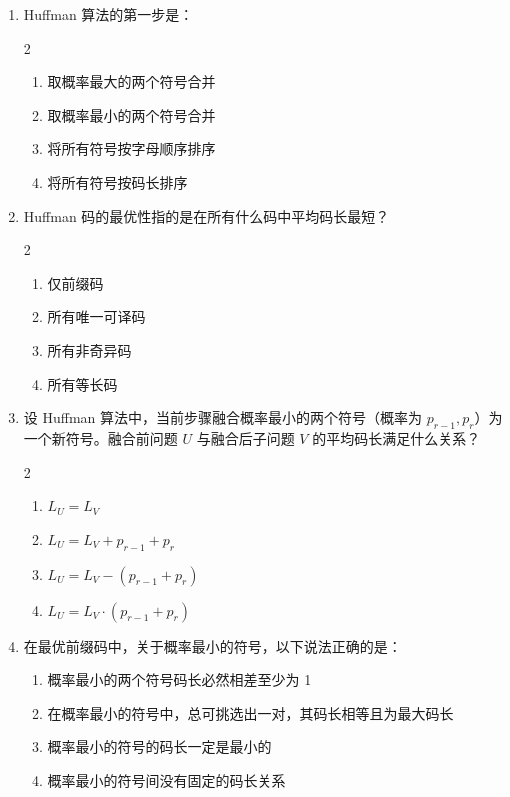 \documentclass[12pt,a4paper]{ctexart}
\begin{document}
\begin{enumerate}[label=\arabic*., leftmargin=*]

\item Huffman 算法的第一步是：
\begin{multicols}{2}
\begin{enumerate}[label=(\Alph*)]
  \item 取概率最大的两个符号合并
  \item 取概率最小的两个符号合并
  \item 将所有符号按字母顺序排序
  \item 将所有符号按码长排序
\end{enumerate}
\end{multicols}

\item Huffman 码的最优性指的是在所有什么码中平均码长最短？
\begin{multicols}{2}
\begin{enumerate}[label=(\Alph*)]
  \item 仅前缀码
  \item 所有唯一可译码
  \item 所有非奇异码
  \item 所有等长码
\end{enumerate}
\end{multicols}

\item 设 Huffman 算法中，当前步骤融合概率最小的两个符号（概率为 $p_{r-1}, p_r$）为一个新符号。融合前问题 $U$ 与融合后子问题 $V$ 的平均码长满足什么关系？
\begin{multicols}{2}
\begin{enumerate}[label=(\Alph*)]
  \item $L_U = L_V$
  \item $L_U = L_V + p_{r-1} + p_r$
  \item $L_U = L_V - (p_{r-1} + p_r)$
  \item $L_U = L_V \cdot (p_{r-1} + p_r)$
\end{enumerate}
\end{multicols}

\item 在最优前缀码中，关于概率最小的符号，以下说法正确的是：
\begin{enumerate}[label=(\Alph*)]
  \item 概率最小的两个符号码长必然相差至少为 1
  \item 在概率最小的符号中，总可挑选出一对，其码长相等且为最大码长
  \item 概率最小的符号的码长一定是最小的
  \item 概率最小的符号间没有固定的码长关系
\end{enumerate}

\end{enumerate}
\end{document}
